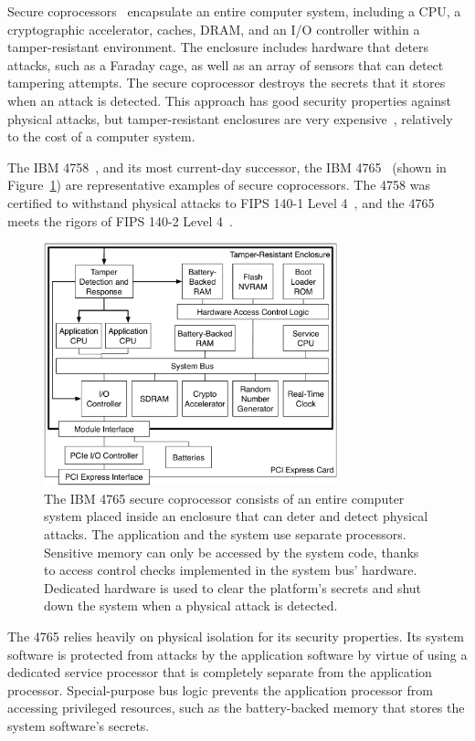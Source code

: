 
Secure coprocessors~\cite{yee1994coprocessors} encapsulate an entire computer
system, including a CPU, a cryptographic accelerator, caches, DRAM, and an I/O
controller within a tamper-resistant environment. The enclosure includes
hardware that deters attacks, such as a Faraday cage, as well as an array of
sensors that can detect tampering attempts. The secure coprocessor destroys the
secrets that it stores when an attack is detected. This approach has good
security properties against physical attacks, but tamper-resistant enclosures
are very expensive~\cite{anderson2001security}, relatively to the cost of a
computer system.

The IBM 4758~\cite{smith1999ibm4758}, and its most current-day successor, the
IBM 4765~\cite{nist2015ibm4765} (shown in Figure~\ref{fig:ibm_4765}) are
representative examples of secure coprocessors. The 4758 was certified to
withstand physical attacks to FIPS 140-1 Level 4~\cite{smith1999validating},
and the 4765 meets the rigors of FIPS 140-2 Level 4~\cite{nist2011fipscert}.

\begin{figure}[hbt]
  \centering
  \includegraphics[width=85mm]{figures/ibm_4765.pdf}
  \caption{
    The IBM 4765 secure coprocessor consists of an entire computer system
    placed inside an enclosure that can deter and detect physical attacks.
    The application and the system use separate processors. Sensitive memory
    can only be accessed by the system code, thanks to access control checks
    implemented in the system bus' hardware. Dedicated hardware is used to clear
    the platform's secrets and shut down the system when a physical attack is
    detected.
  }
  \label{fig:ibm_4765}
\end{figure}

The 4765 relies heavily on physical isolation for its security properties. Its
system software is protected from attacks by the application software by
virtue of using a dedicated service processor that is completely separate from
the application processor. Special-purpose bus logic prevents the application
processor from accessing privileged resources, such as the battery-backed
memory that stores the system software's secrets.

